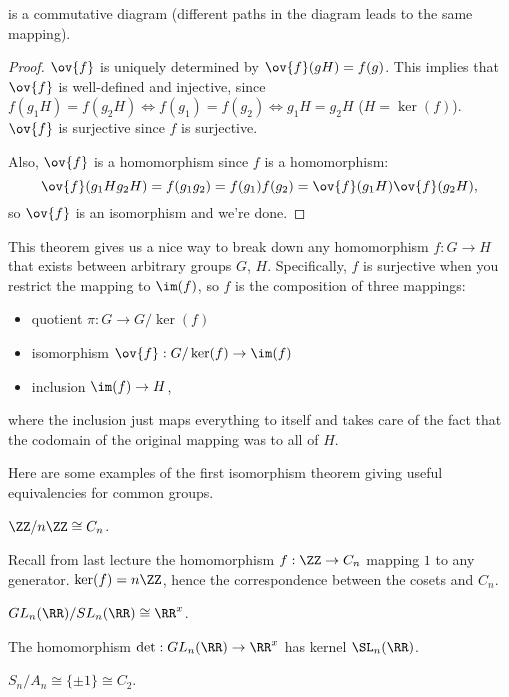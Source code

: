 is a commutative diagram (different paths in the diagram leads to the same mapping). 

\begin{proof}
$\ov{f}$ is uniquely determined by $\ov{f}(gH) = f(g)$. This implies that $\ov{f}$ is well-defined and injective, since $f(g_1H)=f(g_2H)\iff f(g_1)=f(g_2)\iff g_1H=g_2H$ ($H=\ker(f)$). $\ov{f}$ is surjective since $f$ is surjective.

Also, $\ov{f}$ is a homomorphism since $f$ is a homomorphism: 
\[\ov{f}(g_1Hg_2H) = f(g_1g_2)=f(g_1)f(g_2) = \ov{f}(g_1H)\ov{f}(g_2H),\]
so $\ov{f}$ is an isomorphism and we're done. 
\end{proof}

This theorem gives us a nice way to break down any homomorphism $f: G\rightarrow H$ that exists between arbitrary groups $G$, $H$. Specifically, $f$ is surjective when you restrict the mapping to $\im(f)$, so $f$ is the composition of three mappings: 
\begin{itemize}
    \item quotient $\pi: G\rightarrow G/\ker(f)$
    \item isomorphism $\ov{f}: G/\ker(f)\rightarrow \im(f)$
    \item inclusion $\im(f)\rightarrow H$,
\end{itemize}
where the inclusion just maps everything to itself and takes care of the fact that the codomain of the original mapping was to all of $H$. 

\begin{center}
\end{center}

Here are some examples of the first isomorphism theorem giving useful equivalencies for common groups.  
\begin{example}
\exlabel 

$\ZZ/n\ZZ\cong C_n$. 
\end{example}

Recall from last lecture the homomorphism $f: \ZZ\rightarrow C_n$ mapping $1$ to any generator. $\ker(f) = n\ZZ$, hence the correspondence between the cosets and $C_n$. 

\begin{example}
\exlabel

$GL_n(\RR)/SL_n(\RR)\cong \RR^x$.
\end{example}

The homomorphism $\det : GL_n(\RR)\rightarrow \RR^x$ has kernel $\SL_n(\RR)$. 

\begin{example}
\exlabel

$S_n/A_n\cong \{\pm 1\}\cong C_2$.
\end{example}

